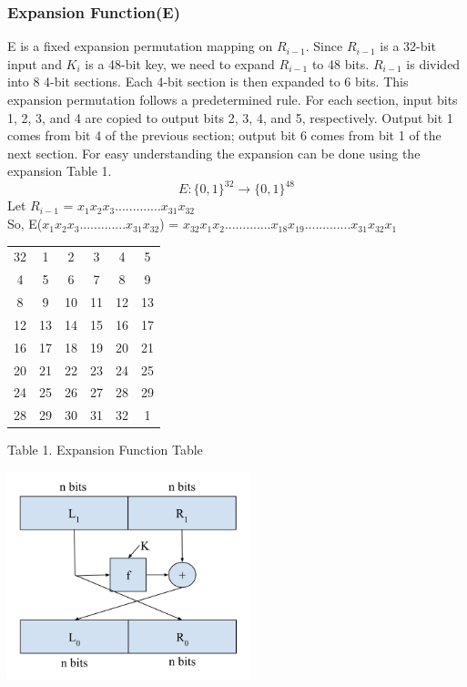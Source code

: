 \documentclass[11pt]{article}
\begin{document}
\subsubsection*{Expansion Function(E)}
E is a fixed expansion permutation mapping on $R_{i-1}$. Since $R_{i-1}$ is a 32-bit input and $K_i$ is a 48-bit key, we need to expand $R_{i-1}$ to 48 bits. $R_{i-1}$ is divided into 8 4-bit sections. Each 4-bit section is then expanded to 6 bits. This expansion permutation follows a predetermined rule. For each section, input bits 1, 2, 3, and 4 are copied to output bits 2, 3, 4, and 5, respectively. Output bit 1 comes from bit 4 of the previous section; output bit 6 comes from bit 1 of the next section. For easy understanding the expansion can be done using the expansion Table 1.
\[ E : \{0, 1\}^{32} \to \{0, 1\}^{48} \]
Let \hspace{1cm} $R_{i-1}$ = $x_1$$x_2$$x_3$.............$x_{31}$$x_{32}$ \\
So, \hspace{1cm} E($x_1$$x_2$$x_3$.............$x_{31}$$x_{32}$) = $x_{32}$$x_1$$x_2$.............$x_{18}$$x_{19}$.............$x_{31}$$x_{32}$$x_1$ 
\begin{center}
\begin{tabular}{ | c | c | c | c | c | c |}
  \hline
    32&	1&	2&	3&	4&  5\\
    4&	5&	6&	7&	8&  9\\
    8&	9&	10&	11&	12&  13\\
    12&	13&	14&	15&	16&  17\\
    16&	17&	18&	19&	20&  21\\
    20&	21&	22&	23&	24&  25\\
    24&	25&	26&	27&	28&  29\\
    28&	29&	30&	31&	32&  1\\
  \hline
\end{tabular}
\end{center}
\begin{center}
Table 1. Expansion Function Table
\end{center}
\begin{center}
\includegraphics[width=200pt]{p2.png}
\end{center}
\end{document}
